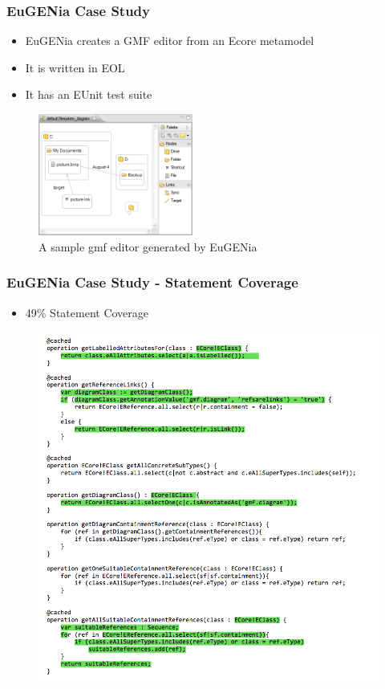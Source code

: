 \begin{frame}
\frametitle{EuGENia Case Study}

\begin{itemize}
\item EuGENia creates a GMF editor from an Ecore metamodel
\item It is written in EOL
\item It has an EUnit test suite
\end{itemize}

\begin{figure}
	\includegraphics[width=2in]{figures/gmfeditor.png}
\caption{A sample gmf editor generated by EuGENia}
\end{figure}

\end{frame}

\begin{frame}
\frametitle{EuGENia Case Study - Statement Coverage}
\begin{itemize}
\item 49\% Statement Coverage
\end{itemize}

\begin{figure}
	\includegraphics[scale=0.3]{./presentation/images/eugenia_statement_coverage.png}
\end{figure}
\end{frame}

